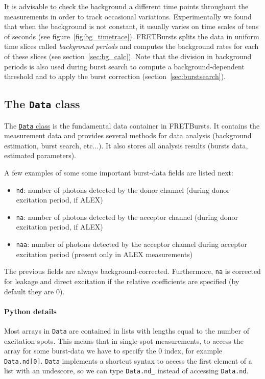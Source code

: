 It is advisable to check the background a different time points 
throughout the measurements in order to track occasional variations. 
Experimentally we found that when the background is not constant, 
it usually varies 
on time scales of tens of seconds (see figure~\ref{fig:bg_timetrace}). 
FRETBursts splits the data in uniform time
slices called \textit{background periods} and computes the background rates for
each of these slices (see section~\ref{sec:bg_calc}). 
Note that the division in background periods is also used during 
burst search to compute a background-dependent
threshold and to apply the burst correction (section~\ref{sec:burstsearch}).

\subsection{The \texttt{Data} class}
\label{sec:data_intro}

The
\href{http://fretbursts.readthedocs.org/en/latest/data_class.html}{\texttt{Data}
class} is the fundamental data container in FRETBursts. It contains the
measurement data and provides several methods for data analysis (background
estimation, burst search, etc...). It also stores all analysis results
(bursts data, estimated parameters).

A few examples of some some important burst-data fields are listed next:

\begin{itemize}
\item \verb|nd|: number of photons detected by the donor channel 
(during donor excitation period, if ALEX)
\item \verb|na|: number of photons detected by the acceptor channel
(during donor excitation period, if ALEX)
\item \verb|naa|: number of photons detected by the acceptor channel 
during acceptor excitation period (present only in ALEX measurements)
\end{itemize}

The previous fields are always background-corrected. Furthermore, 
\verb|na| is corrected for leakage and direct excitation if the 
relative coefficients are specified (by default they are 0).

\paragraph{Python details}

Most arrays in \texttt{Data} are contained in lists with lengths equal to the
number of excitation spots. This means that in 
single-spot measurements, to access the array for some burst-data
we have to specify the 0 index, for example \verb|Data.nd[0]|.
\verb|Data| implements a shortcut syntax to access the first element of a list
with an undescore, so we can type 
\verb|Data.nd_| instead of accessing \verb|Data.nd|.

